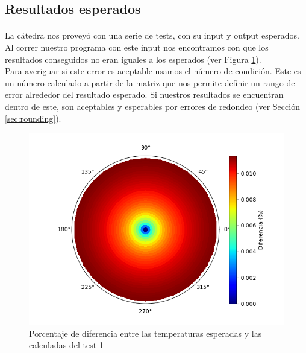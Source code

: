 \documentclass[12pt]{article}
\begin{document}
\subsection{Resultados esperados}
\label{sec:expected}

\paragraph{} La cátedra nos proveyó con una serie de tests, con su input y output esperados. Al correr nuestro programa con este input nos encontramos con que los resultados conseguidos no eran iguales a los esperados (ver Figura \ref{fig:expected.diffs}). \\
Para averiguar si este error es aceptable usamos el número de condición. Este es un número calculado a partir de la matriz que nos permite definir un rango de error alrededor del resultado esperado. Si nuestros resultados se encuentran dentro de este, son aceptables y esperables por errores de redondeo (ver Sección \ref{sec:rounding}).


\begin{figure}[H]
\centering
\includegraphics[scale=0.5]{test1.1.0.temperature}
\caption{Porcentaje de diferencia entre las temperaturas esperadas y las calculadas del test 1}
\label{fig:expected.diffs}
\end{figure}
\end{document}
